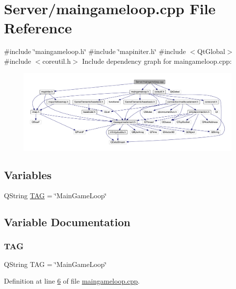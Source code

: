 \hypertarget{a00089}{}\section{Server/maingameloop.cpp File Reference}
\label{a00089}
{\ttfamily \#include \char`\"{}maingameloop.\+h\char`\"{}}\newline
{\ttfamily \#include \char`\"{}mapiniter.\+h\char`\"{}}\newline
{\ttfamily \#include $<$Qt\+Global$>$}\newline
{\ttfamily \#include $<$coreutil.\+h$>$}\newline
Include dependency graph for maingameloop.\+cpp\+:
\nopagebreak
\begin{figure}[H]
\begin{center}
\leavevmode
\includegraphics[width=350pt]{d9/dec/a00090}
\end{center}
\end{figure}
\subsection*{Variables}
\begin{DoxyCompactItemize}
\item 
Q\+String \hyperlink{a00089_a3670baaac428449f4299429202343042}{T\+AG} = \char`\"{}Main\+Game\+Loop\char`\"{}
\end{DoxyCompactItemize}


\subsection{Variable Documentation}
\mbox{\label{a00089_a3670baaac428449f4299429202343042}} 
\subsubsection{\texorpdfstring{T\+AG}{TAG}}
{\footnotesize\ttfamily Q\+String T\+AG = \char`\"{}Main\+Game\+Loop\char`\"{}}



Definition at line \hyperlink{a00089_source_l00006}{6} of file \hyperlink{a00089_source}{maingameloop.\+cpp}.

